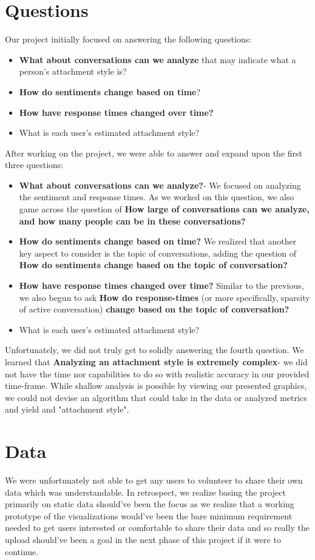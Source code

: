 \documentclass{article}\usepackage{graphicx}
\begin{document}
\section{Questions}
Our project initially focused on answering the following questions:
\begin{itemize}
  \item \textbf{What about conversations can we analyze} that may indicate what a person's attachment style is? 
  \item \textbf{How do sentiments change based on time}? 
  \item \textbf{How have response times changed over time?} 
  \item What is each user's estimated attachment style? 
\end{itemize}
After working on the project, we were able to answer and expand upon the first three questions:
\begin{itemize}
  \item \textbf{What about conversations can we analyze?}- We focused on analyzing the sentiment and response times. As we worked on this question, we also game across the question of \textbf{How large of conversations can we analyze, and how many people can be in these conversations?}
  \item \textbf{How do sentiments change based on time?} We realized that another key aspect to consider is the topic of conversations, adding the question of \textbf{How do sentiments change based on the topic of conversation?} 
  \item \textbf{How have response times changed over time?} Similar to the previous, we also begun to ask \textbf{How do response-times} (or more specifically, sparsity of active conversation) \textbf{change based on the topic of conversation?} 
  \item What is each user's estimated attachment style? 
\end{itemize}
Unfortunately, we did not truly get to solidly answering the fourth question. We learned that \textbf{Analyzing an attachment style is extremely complex}- we did not have the time nor capabilities to do so with realistic accuracy in our provided time-frame. While shallow analysis is possible by viewing our presented graphics, we could not devise an algorithm that could take in the data or analyzed metrics and yield and "attachment style".


\section{Data}
We were unfortunately not able to get any users to volunteer to share their own data which was understandable. In retrospect, we realize basing the project primarily on static data should've been the focus as we realize that a working prototype of the visualizations would've been the bare minimum requirement needed to get users interested or comfortable to share their data and so really the upload should've been a goal in the next phase of this project if it were to continue.\newline
\end{document}
